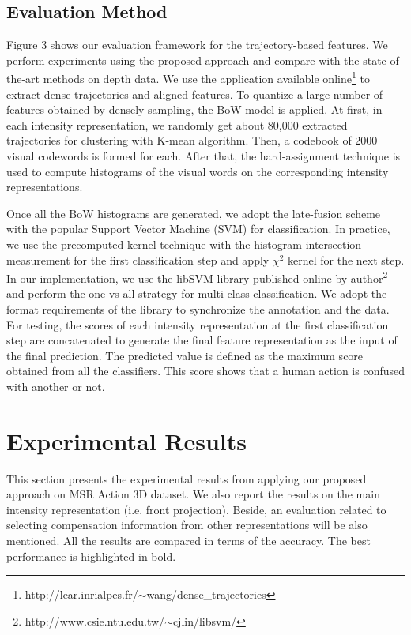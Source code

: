\documentclass[review]{elsarticle}
\begin{document}
\subsection{Evaluation Method}


Figure 3 shows our evaluation framework for the trajectory-based features. We perform experiments using the proposed approach and compare with the state-of-the-art methods on depth data. We use the application available online\footnote{http://lear.inrialpes.fr/$\sim$wang/dense\_trajectories} to extract dense trajectories and aligned-features. To quantize a large number of features obtained by densely sampling, the BoW model is applied. At first, in each intensity representation, we randomly get about 80,000 extracted trajectories for clustering with K-mean algorithm. Then, a codebook of 2000 visual codewords is formed for each. After that, the hard-assignment technique is used to compute histograms of the visual words on the corresponding intensity representations.

Once all the BoW histograms are generated, we adopt the late-fusion scheme with the popular Support Vector Machine (SVM) for classification. In practice, we use the precomputed-kernel technique with the histogram intersection measurement for the first classification step and apply $\chi^2$ kernel for the next step. In our implementation, we use the libSVM library published online by author\footnote{http://www.csie.ntu.edu.tw/$\sim$cjlin/libsvm/} and perform the one-vs-all strategy for multi-class classification. We adopt the format requirements of the library to synchronize the annotation and the data. For testing, the scores of each intensity representation at the first classification step are concatenated to generate the final feature representation as the input of the final prediction. The predicted value is defined as the maximum score obtained from all the classifiers. This score shows that a human action is confused with another or not.

\section{Experimental Results}
\label{lbl:ExperimentalResults}
This section presents the experimental results from applying our proposed approach on MSR Action 3D dataset. We also report the results on the main intensity representation (i.e. front projection). Beside, an evaluation related to selecting compensation information from other representations will be also mentioned. All the results are compared in terms of the accuracy. The best performance is highlighted in bold.
\end{document}
